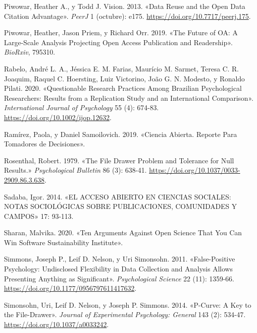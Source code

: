 \documentclass[
  spanish,
  a4paper,
  oneside]{scrbook}
\newlength{\cslhangindent}
\newenvironment{CSLReferences}[2] %
 {\begin{list}{}{%
  \setlength{\itemindent}{0pt}
  \setlength{\leftmargin}{0pt}
  \setlength{\parsep}{0pt}
  \ifodd #1
   \setlength{\leftmargin}{\cslhangindent}
   \setlength{\itemindent}{-1\cslhangindent}
  \fi
  \setlength{\itemsep}{#2\baselineskip}}}
 {\end{list}}
\begin{document}
\begin{CSLReferences}{1}{0}
Piwowar, Heather A., y Todd J. Vision. 2013. {«Data Reuse and the Open
Data Citation Advantage»}. \emph{PeerJ} 1 (octubre): e175.
\url{https://doi.org/10.7717/peerj.175}.

Piwowar, Heather, Jason Priem, y Richard Orr. 2019. {«The {Future} of
{OA}: {A} Large-Scale Analysis Projecting {Open Access} Publication and
Readership»}. \emph{BioRxiv}, 795310.

Rabelo, André L. A., Jéssica E. M. Farias, Maurício M. Sarmet, Teresa C.
R. Joaquim, Raquel C. Hoersting, Luiz Victorino, João G. N. Modesto, y
Ronaldo Pilati. 2020. {«Questionable Research Practices Among
{Brazilian} Psychological Researchers: {Results} from a Replication
Study and an International Comparison»}. \emph{International Journal of
Psychology} 55 (4): 674-83. \url{https://doi.org/10.1002/ijop.12632}.

Ramírez, Paola, y Daniel Samoilovich. 2019. {«Ciencia {Abierta}.
{Reporte Para Tomadores} de {Decisiones}»}.

Rosenthal, Robert. 1979. {«The File Drawer Problem and Tolerance for
Null Results.»} \emph{Psychological Bulletin} 86 (3): 638-41.
\url{https://doi.org/10.1037/0033-2909.86.3.638}.

Sadaba, Igor. 2014. {«{EL ACCESO ABIERTO EN CIENCIAS SOCIALES}: {NOTAS
SOCIOL{Ó}GICAS SOBRE PUBLICACIONES}, {COMUNIDADES Y CAMPOS}»} 17:
93-113.

Sharan, Malvika. 2020. {«Ten {Arguments Against Open Science That You
Can Win} {\textbar} {Software Sustainability Institute}»}.

Simmons, Joseph P., Leif D. Nelson, y Uri Simonsohn. 2011.
{«False-{Positive Psychology}: {Undisclosed Flexibility} in {Data
Collection} and {Analysis Allows Presenting Anything} as
{Significant}»}. \emph{Psychological Science} 22 (11): 1359-66.
\url{https://doi.org/10.1177/0956797611417632}.

Simonsohn, Uri, Leif D. Nelson, y Joseph P. Simmons. 2014. {«P-Curve:
{A} Key to the File-Drawer»}. \emph{Journal of Experimental Psychology:
General} 143 (2): 534-47. \url{https://doi.org/10.1037/a0033242}.


\end{CSLReferences}
\end{document}
